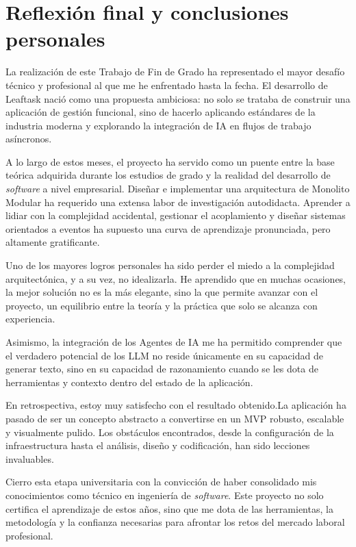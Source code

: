 \section{Reflexión final y conclusiones personales}
La realización de este Trabajo de Fin de Grado ha representado el mayor desafío técnico y profesional al que me he enfrentado hasta la fecha. El desarrollo de Leaftask nació como una propuesta ambiciosa: no solo se trataba de construir una aplicación de gestión funcional, sino de hacerlo aplicando estándares de la industria moderna y explorando la integración de \ac{IA} en flujos de trabajo asíncronos.

A lo largo de estos meses, el proyecto ha servido como un puente entre la base teórica adquirida durante los estudios de grado y la realidad del desarrollo de \emph{software} a nivel empresarial. Diseñar e implementar una arquitectura de Monolito Modular ha requerido una extensa labor de investigación autodidacta. Aprender a lidiar con la complejidad accidental, gestionar el acoplamiento y diseñar sistemas orientados a eventos ha supuesto una curva de aprendizaje pronunciada, pero altamente gratificante.

Uno de los mayores logros personales ha sido perder el miedo a la complejidad arquitectónica, y a su vez, no idealizarla. He aprendido que en muchas ocasiones, la mejor solución no es la más elegante, sino la que permite avanzar con el proyecto, un equilibrio entre la teoría y la práctica que solo se alcanza con experiencia.

Asimismo, la integración de los Agentes de \ac{IA} me ha permitido comprender que el verdadero potencial de los \ac{LLM} no reside únicamente en su capacidad de generar texto, sino en su capacidad de razonamiento cuando se les dota de herramientas y contexto dentro del estado de la aplicación.

En retrospectiva, estoy muy satisfecho con el resultado obtenido.La aplicación ha pasado de ser un concepto abstracto a convertirse en un \ac{MVP} robusto, escalable y visualmente pulido. Los obstáculos encontrados, desde la configuración de la infraestructura hasta el análisis, diseño y codificación, han sido lecciones invaluables.

Cierro esta etapa universitaria con la convicción de haber consolidado mis conocimientos como técnico en ingeniería de \emph{software}. Este proyecto no solo certifica el aprendizaje de estos años, sino que me dota de las herramientas, la metodología y la confianza necesarias para afrontar los retos del mercado laboral profesional.
